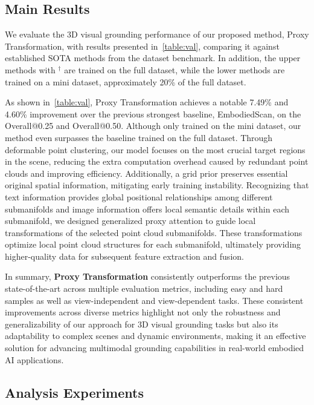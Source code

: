\subsection{Main Results}\label{sub:main results}
We evaluate the 3D visual grounding performance of our proposed method, Proxy Transformation, with results presented in~\cref{table:val}, comparing it against established SOTA methods from the dataset benchmark. In addition, the upper methods with $^\dagger$ are trained on the full dataset, while the lower methods are trained on a mini dataset, approximately 20\% of the full dataset.

As shown in~\cref{table:val}, Proxy Transformation achieves a notable 7.49\% and 4.60\% improvement over the previous strongest baseline, EmbodiedScan, on the Overall@0.25 and Overall@0.50. Although only trained on the mini dataset, our method even surpasses the baseline trained on the full dataset. Through deformable point clustering, our model focuses on the most crucial target regions in the scene, reducing the extra computation overhead caused by redundant point clouds and improving efficiency. Additionally, a grid prior preserves essential original spatial information, mitigating early training instability. Recognizing that text information provides global positional relationships among different submanifolds and image information offers local semantic details within each submanifold, we designed generalized proxy attention to guide local transformations of the selected point cloud submanifolds. These transformations optimize local point cloud structures for each submanifold, ultimately providing higher-quality data for subsequent feature extraction and fusion.


In summary, \textbf{Proxy Transformation} consistently outperforms the previous state-of-the-art across multiple evaluation metrics, including easy and hard samples as well as view-independent and view-dependent tasks. These consistent improvements across diverse metrics highlight not only the robustness and generalizability of our approach for 3D visual grounding tasks but also its adaptability to complex scenes and dynamic environments, making it an effective solution for advancing multimodal grounding capabilities in real-world embodied AI applications.

 

\subsection{Analysis Experiments}
\label{sub:analysis}


